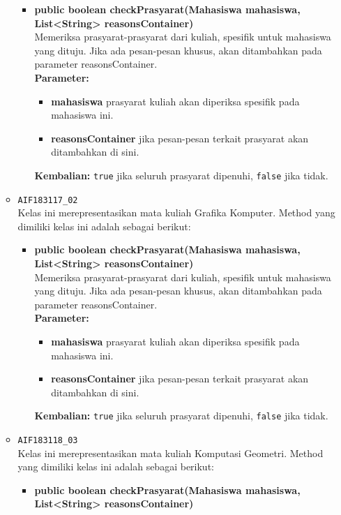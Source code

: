 \begin{enumerate}
\begin{itemize}
\begin{itemize}
			\item \textbf{public boolean checkPrasyarat(Mahasiswa mahasiswa, List<String> reasonsContainer)}\\
			Memeriksa prasyarat-prasyarat dari kuliah, spesifik untuk mahasiswa yang dituju. Jika ada pesan-pesan khusus, akan ditambahkan pada parameter reasonsContainer.\\
			\textbf{Parameter:}
			\begin{itemize}
				\item \textbf{mahasiswa} prasyarat kuliah akan diperiksa spesifik pada mahasiswa ini.
				\item \textbf{reasonsContainer} jika pesan-pesan terkait prasyarat akan ditambahkan di sini.
			\end{itemize}
			\textbf{Kembalian:} \texttt{true} jika seluruh prasyarat dipenuhi, \texttt{false} jika tidak.
		\end{itemize}
		\item \texttt{AIF183117\_02} \\
		Kelas ini merepresentasikan mata kuliah Grafika Komputer. Method yang dimiliki kelas ini adalah sebagai berikut: 
		\begin{itemize}
			\item \textbf{public boolean checkPrasyarat(Mahasiswa mahasiswa, List<String> reasonsContainer)}\\
			Memeriksa prasyarat-prasyarat dari kuliah, spesifik untuk mahasiswa yang dituju. Jika ada pesan-pesan khusus, akan ditambahkan pada parameter reasonsContainer.\\
			\textbf{Parameter:}
			\begin{itemize}
				\item \textbf{mahasiswa} prasyarat kuliah akan diperiksa spesifik pada mahasiswa ini.
				\item \textbf{reasonsContainer} jika pesan-pesan terkait prasyarat akan ditambahkan di sini.
			\end{itemize}
			\textbf{Kembalian:} \texttt{true} jika seluruh prasyarat dipenuhi, \texttt{false} jika tidak.
		\end{itemize}
		\item \texttt{AIF183118\_03} \\
		Kelas ini merepresentasikan mata kuliah Komputasi Geometri. Method yang dimiliki kelas ini adalah sebagai berikut: 
		\begin{itemize}
			\item \textbf{public boolean checkPrasyarat(Mahasiswa mahasiswa, List<String> reasonsContainer)}\\

\end{itemize}
\end{itemize}
\end{enumerate}
